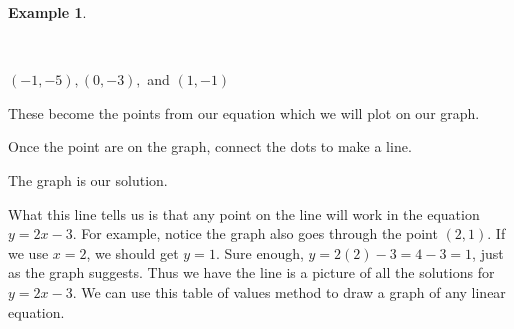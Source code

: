 \documentclass[12pt]{book}
\theoremstyle{definition}
\newtheorem{example}{Example}
\begin{document}
\begin{example}
\begin{multicols}{2}
\columnbreak
    \ \par 
    $(- 1, - 5), (0, - 3),$ and $(1, - 1)$\par
     These become the points from our equation which we will plot on our graph.\par    
     Once the point are on the graph, connect the dots to make a line.\par
     The graph is our solution.
  \end{multicols}
\end{example}
What this line tells us is that any point on the line will work in the equation $y = 2 x - 3$. For example, notice the graph also goes through the point $(2, 1)$. If we use $x = 2$, we should get $y = 1$. Sure enough, $y = 2 (2) - 3 = 4 - 3 = 1$, just as the graph suggests. Thus we have the line is a picture of all the solutions for $y = 2 x - 3$. We can use this table of values method to draw a graph of any linear equation.
\end{document}
